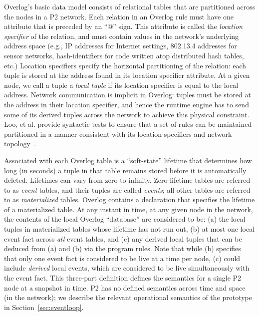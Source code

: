 Overlog's basic data model consists of
relational tables that are partitioned across the nodes in a P2 network.
Each relation in an Overlog rule must have one attribute that is
preceded by an ``@'' sign.  This attribute is called the {\em location
  specifier} of the relation, and must contain values in the network's
underlying address space (e.g., IP addresses for Internet settings,
802.13.4 addresses for sensor networks, hash-identifiers for code
written atop distributed hash tables, etc.)  Location specifiers specify
the horizontal partitioning of the relation: each tuple is stored at the
address found in its location specifier attribute.  At a given node, we
call a tuple a {\em local tuple} if its location specifier is equal to
the local address.  Network communication is implicit in Overlog: tuples
must be stored at the address in their location specifier, and hence the
runtime engine has to send some of its derived tuples across the network
to achieve this physical constraint.  Loo, et al. provide syntactic tests to
ensure that a set of rules can be maintained partitioned in a manner
consistent with its location specifiers and network
topology~\cite{loo-sigmod06}.


Associated with each Overlog table is a
``soft-state'' lifetime that determines how long (in seconds) a tuple in
that table remains stored before it is automatically deleted.  Lifetimes
can vary from zero to infinity.  Zero-lifetime tables are referred to as
{\em event} tables, and their tuples are called \emph{events}; all other
tables are referred to as {\em materialized} tables.  Overlog contains a
 declaration that specifies the lifetime of a
materialized table.  At any instant in time, at any given node in the
network, the contents of the local Overlog ``database'' are considered
to be: (a) the local tuples in materialized tables whose lifetime has
not run out, (b) at most one local event fact across {\em all} event
tables, and (c) any derived local tuples that can be deduced from (a)
and (b) via the program rules.  Note that while (b) specifies that only
one event fact is considered to be live at a time per node, (c) could
include {\em derived} local events, which are considered to be live
simultaneously with the event fact.  This three-part definition defines the semantics for a
single P2 node at a snapshot in time.  P2 has no defined semantics
across time and space (in the network); we describe the relevant operational
semantics of the prototype in Section~\ref{sec:eventloop}.
     
